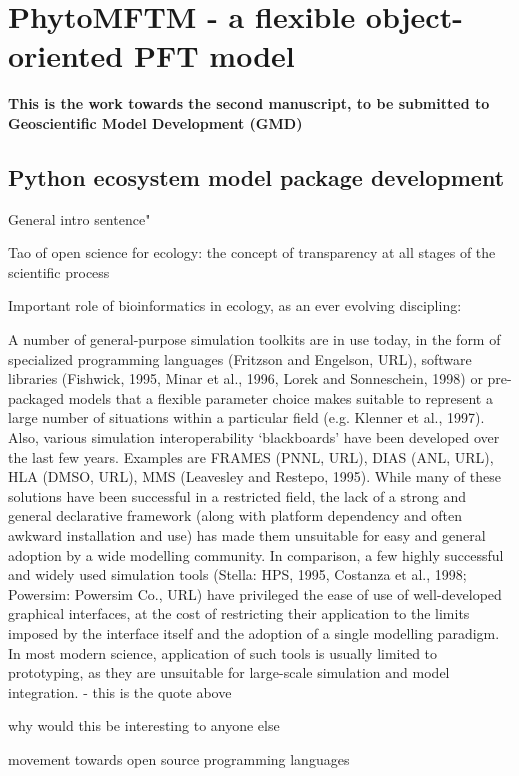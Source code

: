\chapter{PhytoMFTM - a flexible object-oriented PFT model}


\small {\textbf{This is the work towards the second manuscript, to be submitted to Geoscientific Model Development (GMD)}}


\normalsize
\section{Python ecosystem model package development}
General intro sentence" 

Tao of open science for ecology: \citep{Hampton2015}
the concept of transparency at all stages of the scientific process

Important role of bioinformatics in ecology, as an ever evolving discipling: \citep{Michener2012}

A number of general-purpose simulation toolkits are in use today, in the form of specialized programming languages (Fritzson and Engelson, URL), software libraries (Fishwick, 1995, Minar et al., 1996, Lorek and Sonneschein, 1998) or pre-packaged models that a flexible parameter choice makes suitable to represent a large number of situations within a particular field (e.g. Klenner et al., 1997). Also, various simulation interoperability ‘blackboards’ have been developed over the last few years. Examples are FRAMES (PNNL, URL), DIAS (ANL, URL), HLA (DMSO, URL), MMS (Leavesley and Restepo, 1995). While many of these solutions have been successful in a restricted field, the lack of a strong and general declarative framework (along with platform dependency and often awkward installation and use) has made them unsuitable for easy and general adoption by a wide modelling community. In comparison, a few highly successful and widely used simulation tools (Stella: HPS, 1995, Costanza et al., 1998; Powersim: Powersim Co., URL) have privileged the ease of use of well-developed graphical interfaces, at the cost of restricting their application to the limits imposed by the interface itself and the adoption of a single modelling paradigm. In most modern science, application of such tools is usually limited to prototyping, as they are unsuitable for large-scale simulation and model integration.
\citep{Villa2001} - this is the quote above
 
why would this be interesting to anyone else


movement towards open source programming languages

